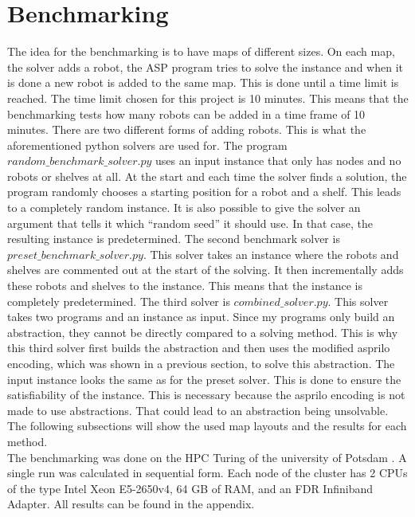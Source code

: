 \documentclass[runningheads]{llncs}
\begin{document}
\section{Benchmarking}
The idea for the benchmarking is to have maps of different sizes. On each map, the solver adds a robot, the ASP program tries to solve the instance and when it is done a new robot is added to the same map. This is done until a time limit is reached. The time limit chosen for this project is 10 minutes. This means that the benchmarking tests how many robots can be added in a time frame of 10 minutes. There are two different forms of adding robots. This is what the aforementioned python solvers are used for. The program $random\_benchmark\_solver.py$ uses an input instance that only has nodes and no robots or shelves at all. At the start and each time the solver finds a solution, the program randomly chooses a starting position for a robot and a shelf. This leads to a completely random instance. It is also possible to give the solver an argument that tells it which ``random seed'' it should use. In that case, the resulting instance is predetermined. The second benchmark solver is $preset\_benchmark\_solver.py$. This solver takes an instance where the robots and shelves are commented out at the start of the solving. It then incrementally adds these robots and shelves to the instance. This means that the instance is completely predetermined. The third solver is $combined\_solver.py$. This solver takes two programs and an instance as input. Since my programs only build an abstraction, they cannot be directly compared to a solving method. This is why this third solver first builds the abstraction and then uses the modified asprilo encoding, which was shown in a previous section, to solve this abstraction. The input instance looks the same as for the preset solver. This is done to ensure the satisfiability of the instance. This is necessary because the asprilo encoding is not made to use abstractions. That could lead to an abstraction being unsolvable. The following subsections will show the used map layouts and the results for each method. \\
The benchmarking was done on the HPC Turing of the university of Potsdam \cite{hpc}. A single run was calculated in sequential form. Each node of the cluster has 2 CPUs of the type Intel Xeon E5-2650v4, 64 GB of RAM, and an FDR Infiniband Adapter. All results can be found in the appendix.
\end{document}
